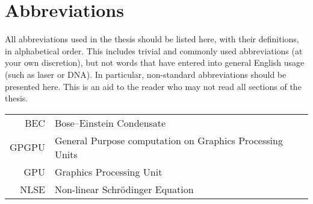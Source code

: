 \chapter*{Abbreviations} 

All abbreviations used in the thesis should be listed here, with their definitions, in alphabetical order.  This includes trivial and commonly used abbreviations (at your own discretion), but not words that have entered into general English usage (such as laser or DNA).  In particular, non-standard abbreviations should be presented here.  This is an aid to the reader who may not read all sections of the thesis. \\ %

\begin{longtable}{rl}
BEC & Bose--Einstein Condensate \\
GPGPU & General Purpose computation on Graphics Processing Units \\
GPU & Graphics Processing Unit \\ 
NLSE & Non-linear Schr\"odinger Equation
\end{longtable}
